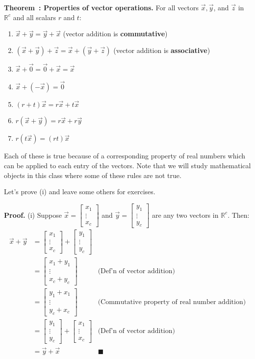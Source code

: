 \documentclass[11pt, letterpaper]{report}
\newenvironment{notes}{}{}
\newenvironment{book}{}{}
\newcounter{exercise}[section]
\newcounter{theorem}[chapter]
\newenvironment{theorem}[1][]{\refstepcounter{theorem}\begin{bbox}\par
    \noindent\textbf{Theorem~\thetheorem: #1}}{\end{bbox}}
\newlength\oldfboxsep%
\newlength\myminiwidth%
\newenvironment{bbox}{%
  \setlength\oldfboxsep\fboxsep
  \setlength{\fboxsep}{.1in}%
  \setlength\myminiwidth\linewidth%
  \addtolength\myminiwidth{-0.2in}%
  \vspace{0.1in}%
  \begin{lrbox}{\bboxbox}\begin{minipage}{\myminiwidth}%
    }{%
    \end{minipage}\end{lrbox}%
  \noindent\fbox{\usebox{\bboxbox}}\vspace{0.1in}\setlength\fboxsep\oldfboxsep%
}
\newcommand{\R}{\mathbb{R}}
\newcommand{\bbbvec}[3]{
  \begin{bmatrix} #1 \\ #2 \\ #3 \end{bmatrix}
}
\begin{document}
\begin{theorem}[Properties of vector operations.]
\label{properties-of-vector-operations}
For all vectors $\vec{x}, \vec{y}$, and $\vec{z}$ in $\R^c$ and all scalars $r$ and $t$:
\begin{enumerate}[label=(\roman*)]
\item $\vec{x}+ \vec{y} = \vec{y} + \vec{x}$ \quad (vector addition is \textbf{commutative})
\item $(\vec{x} + \vec{y}) + \vec{z} = \vec{x} + (\vec{y} + \vec{z})$ \quad (vector addition is \textbf{associative})
\item $\vec{x} + \vec{0} = \vec{0} + \vec{x} = \vec{x}$
\item $\vec{x} + (- \vec{x}) = \vec{0}$
\item $(r+t) \vec{x} = r \vec{x} + t \vec{x}$
\item $r(\vec{x} + \vec{y}) = r\vec{x} + r\vec{y}$
\item $r(t\vec{x}) = (rt)\vec{x}$
\end{enumerate}
\end{theorem}

Each of these is true because of a corresponding property of real numbers which can be applied to each entry of the vectors. Note that we will study mathematical objects in this class where some of these rules are not true.

Let's prove (i) and leave some others for exercises.

\begin{notes}
\vfill
\end{notes}

\begin{book}
\textbf{Proof.} (i) Suppose $\vec{x}=\bbbvec{x_1}{\vdots}{x_c}$ and $\vec{y}=\bbbvec{y_1}{\vdots}{y_c}$ are any two vectors in $\R^c$. Then:
\begin{align*}\vec{x}+\vec{y} &= \bbbvec{x_1}{\vdots}{x_c} + \bbbvec{y_1}{\vdots}{y_c} \\
&= \bbbvec{x_1+y_1}{\vdots}{x_c+y_c} &\text{(Def'n of vector addition)} \\
&= \bbbvec{y_1+x_1}{\vdots}{y_c+x_c} &\text{(Commutative property of real number addition)}\\
&= \bbbvec{y_1}{\vdots}{y_c} + \bbbvec{x_1}{\vdots}{x_c} &\text{(Def'n of vector addition)}\\
&= \vec{y}+\vec{x} & \blacksquare
\end{align*}

\end{book}
\end{document}
